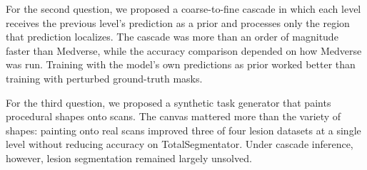 \documentclass[hidelinks, a4paper, 12pt, ngerman, english]{article}  %
\begin{document}
For the second question, we proposed a coarse-to-fine cascade in which each
level receives the previous level's prediction as a prior and processes only
the region that prediction localizes. The cascade was more than an order of
magnitude faster than Medverse, while the accuracy comparison depended on how
Medverse was run. Training with the model's own predictions as prior worked
better than training with perturbed ground-truth masks.

For the third question, we proposed a synthetic task generator that paints
procedural shapes onto scans. The canvas mattered more than the variety of
shapes: painting onto real scans improved three of four lesion datasets
at a single level without reducing accuracy on TotalSegmentator. Under cascade
inference, however, lesion segmentation remained largely unsolved.%

\printglossary[type=symbols,style=long-name-desc-loc]
\listoffigures
\listoftables
\renewcommand{\lstlistlistingname}{\iflanguage{english}{List of Algorithms}{Algorithmenverzeichnis}}
\lstlistoflistings
\printglossary[type=main,style=long-name-desc-loc]


\section*{}\label{sec:appendix}
\end{document}
